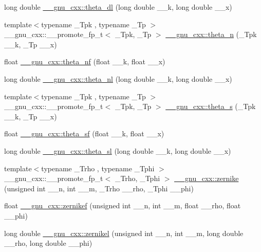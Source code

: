 \begin{DoxyCompactItemize}
\item 
long double \hyperlink{group__gnu__math__spec__func_gacce4474168b9638ebeaad1c7b351fa04}{\+\_\+\+\_\+gnu\+\_\+cxx\+::theta\+\_\+dl} (long double \+\_\+\+\_\+k, long double \+\_\+\+\_\+x)
\item 
{\footnotesize template$<$typename \+\_\+\+Tpk , typename \+\_\+\+Tp $>$ }\\\+\_\+\+\_\+gnu\+\_\+cxx\+::\+\_\+\+\_\+promote\+\_\+fp\+\_\+t$<$ \+\_\+\+Tpk, \+\_\+\+Tp $>$ \hyperlink{group__gnu__math__spec__func_ga42cbac5ad88b02d05e2e615ffc4375f9}{\+\_\+\+\_\+gnu\+\_\+cxx\+::theta\+\_\+n} (\+\_\+\+Tpk \+\_\+\+\_\+k, \+\_\+\+Tp \+\_\+\+\_\+x)
\item 
float \hyperlink{group__gnu__math__spec__func_ga5298a95e02bd909d55e59c1f2a0b51f8}{\+\_\+\+\_\+gnu\+\_\+cxx\+::theta\+\_\+nf} (float \+\_\+\+\_\+k, float \+\_\+\+\_\+x)
\item 
long double \hyperlink{group__gnu__math__spec__func_ga907f6c147387d55d2dfccbc58d1f1bc5}{\+\_\+\+\_\+gnu\+\_\+cxx\+::theta\+\_\+nl} (long double \+\_\+\+\_\+k, long double \+\_\+\+\_\+x)
\item 
{\footnotesize template$<$typename \+\_\+\+Tpk , typename \+\_\+\+Tp $>$ }\\\+\_\+\+\_\+gnu\+\_\+cxx\+::\+\_\+\+\_\+promote\+\_\+fp\+\_\+t$<$ \+\_\+\+Tpk, \+\_\+\+Tp $>$ \hyperlink{group__gnu__math__spec__func_gad224ed8fcc65152f2af9e52a80bfad8a}{\+\_\+\+\_\+gnu\+\_\+cxx\+::theta\+\_\+s} (\+\_\+\+Tpk \+\_\+\+\_\+k, \+\_\+\+Tp \+\_\+\+\_\+x)
\item 
float \hyperlink{group__gnu__math__spec__func_ga5e69cf30c9a4cc057accc43e8c4bf7a3}{\+\_\+\+\_\+gnu\+\_\+cxx\+::theta\+\_\+sf} (float \+\_\+\+\_\+k, float \+\_\+\+\_\+x)
\item 
long double \hyperlink{group__gnu__math__spec__func_gac574077067a4e7b24a0a9ff2d537d885}{\+\_\+\+\_\+gnu\+\_\+cxx\+::theta\+\_\+sl} (long double \+\_\+\+\_\+k, long double \+\_\+\+\_\+x)
\item 
{\footnotesize template$<$typename \+\_\+\+Trho , typename \+\_\+\+Tphi $>$ }\\\+\_\+\+\_\+gnu\+\_\+cxx\+::\+\_\+\+\_\+promote\+\_\+fp\+\_\+t$<$ \+\_\+\+Trho, \+\_\+\+Tphi $>$ \hyperlink{group__gnu__math__spec__func_ga5df3bb50b78cd1bc676763dbf9e64929}{\+\_\+\+\_\+gnu\+\_\+cxx\+::zernike} (unsigned int \+\_\+\+\_\+n, int \+\_\+\+\_\+m, \+\_\+\+Trho \+\_\+\+\_\+rho, \+\_\+\+Tphi \+\_\+\+\_\+phi)
\item 
float \hyperlink{group__gnu__math__spec__func_gababce1066ecef7258070b9b7fcea975f}{\+\_\+\+\_\+gnu\+\_\+cxx\+::zernikef} (unsigned int \+\_\+\+\_\+n, int \+\_\+\+\_\+m, float \+\_\+\+\_\+rho, float \+\_\+\+\_\+phi)
\item 
long double \hyperlink{group__gnu__math__spec__func_ga9236dd8545b448da9cb05dd8b7cf6811}{\+\_\+\+\_\+gnu\+\_\+cxx\+::zernikel} (unsigned int \+\_\+\+\_\+n, int \+\_\+\+\_\+m, long double \+\_\+\+\_\+rho, long double \+\_\+\+\_\+phi)
\end{DoxyCompactItemize}


